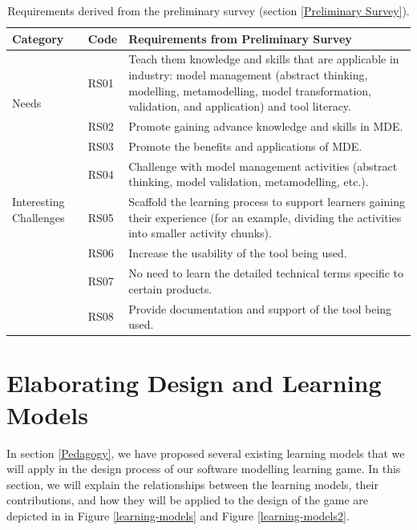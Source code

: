 \documentclass[12pt, a4paper]{report}
\begin{document}
\begin{table}[ht]
\caption{Requirements derived from the preliminary survey (section \ref{Preliminary Survey}).}
\label{table:preliminary-survey}
\begin{center}
\begin{tabular}{ p{2cm}p{1cm}p{10cm} } 
\hline
Category & Code & Requirements from Preliminary Survey \\
\hline
\multirow{3}{2cm}{Needs} 
& RS01 & Teach them knowledge and skills that are applicable in industry: model management (abstract thinking, modelling, metamodelling, model transformation, validation, and application) and tool literacy. \\ 
\hline
\multirow{3}{2cm}{Motivations}
& RS02 & Promote gaining advance knowledge and skills in MDE. \\ 
& RS03 & Promote the benefits and applications of MDE. \\ 
\hline
\multirow{3}{2cm}{Interesting Challenges}
& RS04 & Challenge with model management activities (abstract thinking, model validation, metamodelling, etc.). \\ 
& RS05 & Scaffold the learning process to support learners gaining their experience (for an example, dividing the activities into smaller activity chunks). \\ 
\hline
\multirow{3}{2cm}{Un-interesting Challenges}
& RS06 & Increase the usability of the tool being used. \\ 
& RS07 & No need to learn the detailed technical terms specific to certain products. \\ 
& RS08 & Provide documentation and support of the tool being used. \\ 
\hline
\end{tabular}
\end{center}
\end{table}

\section{Elaborating Design and Learning Models}
In section \ref{Pedagogy}, we have proposed several existing learning models that we will apply in the design process of our software modelling learning game. In this section, we will explain the relationships between the learning models, their contributions, and how they will be applied to the design of the game are depicted in in Figure \ref{learning-models} and Figure \ref{learning-models2}.
\end{document}
